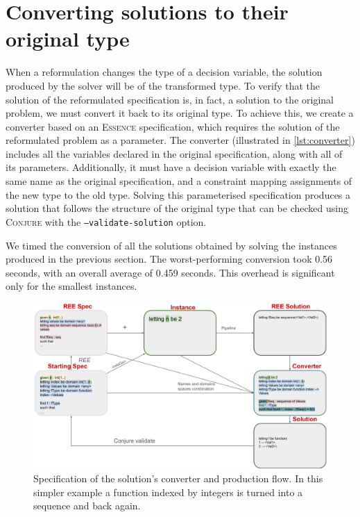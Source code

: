 \documentclass[a4paper,UKenglish,cleveref,pdfa]{lipics-v2021}
\newcommand{\essence}{\textsc{Essence}\xspace}
\newcommand{\conjure}{\textsc{Conjure}\xspace}
\newcommand{\code}[1]{{\small\texttt{{#1}}}}
\begin{document}
\section{Converting solutions to their original type}

When a reformulation changes the type of a decision variable, the solution produced by the solver will be of the transformed type. To verify that the solution of the reformulated specification is, in fact, a solution to the original problem, we must convert it back to its original type. To achieve this, we create a converter based on an \essence specification, which requires the solution of the reformulated problem as a parameter. The converter (illustrated in \cref{lst:converter}) includes all the variables declared in the original specification, along with all of its parameters. Additionally, it must have a decision variable with exactly the same name as the original specification, and a constraint mapping assignments of the new type to the old type. Solving this parameterised specification produces a solution that follows the structure of the original type that can be checked using \conjure with the \code{--validate-solution} option.

We timed the conversion of all the solutions obtained by solving the instances produced in the previous section. The worst-performing conversion took 0.56 seconds, with an overall average of 0.459 seconds. This overhead is significant only for the smallest instances.
\begin{figure}[ht]
    \centering
\includegraphics[width=\columnwidth]{ConverterCraft.pdf}
    \caption{Specification of the solution's converter and production flow. In this simpler example a function indexed by integers is turned into a sequence and back again.}
\end{figure}
\end{document}
